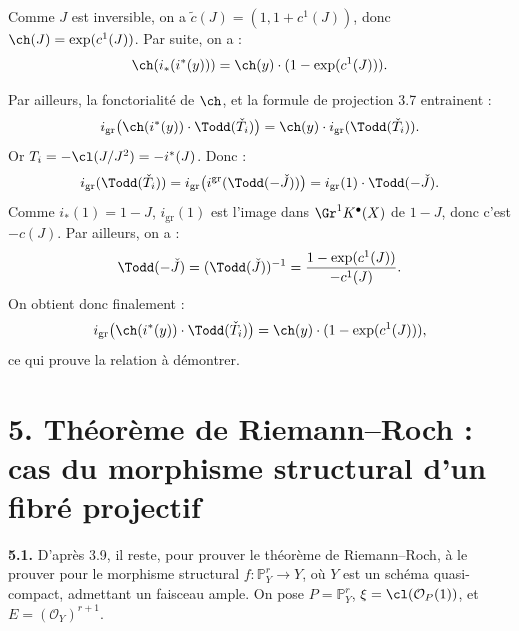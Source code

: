 Comme \(J\) est inversible, on a \(\widetilde c(J)=(1,1+c^1(J))\), donc \(\ch(J)=\exp(c^1(J))\).
Par suite, on a :
\[
 \ch(i_*(i^*(y)))=\ch(y)\cdot(1-\exp(c^1(J))).
\]

Par ailleurs, la fonctorialité de \(\ch\), et la formule de projection 3.7 entrainent :
\[
 i_{\mathrm{gr}}\bigl(\ch(i^*(y))\cdot\Todd(\check T_i)\bigr)
 =
 \ch(y)\cdot i_{\mathrm{gr}}(\Todd(\check T_i)).
\]
Or \(T_i=-\cl(J/J^2)=-i^*(J)\). Donc :
\[
 i_{\mathrm{gr}}(\Todd(\check T_i))
 =
 i_{\mathrm{gr}}\bigl(i^{\mathrm{gr}}(\Todd(-\check J))\bigr)
 =
 i_{\mathrm{gr}}(1)\cdot\Todd(-\check J).
\]
Comme \(i_*(1)=1-J\), \(i_{\mathrm{gr}}(1)\) est l'image dans \(\Gr^1K^{\bullet}(X)\) de \(1-J\), donc c'est \(-c(J)\). Par ailleurs, on a :
\[
 \Todd(-\check J)=(\Todd(\check J))^{-1}
 =
 \frac{1-\exp(c^1(J))}{-c^1(J)}.
\]
On obtient donc finalement :
\[
 i_{\mathrm{gr}}\bigl(\ch(i^*(y))\cdot\Todd(\check T_i)\bigr)
 =
 \ch(y)\cdot(1-\exp(c^1(J))),
\]
ce qui prouve la relation à démontrer.

\section*{5. Théorème de Riemann--Roch : cas du morphisme structural d'un fibré projectif}

\textbf{5.1.} D'après 3.9, il reste, pour prouver le théorème de Riemann--Roch, à le prouver pour le morphisme structural \(f:\mathbb P^r_Y\longrightarrow Y\), où \(Y\) est un schéma quasi-compact, admettant un faisceau ample. On pose \(P=\mathbb P^r_Y\), \(\xi=\cl(\mathcal O_P(1))\), et \(E=(\mathcal O_Y)^{r+1}\).

